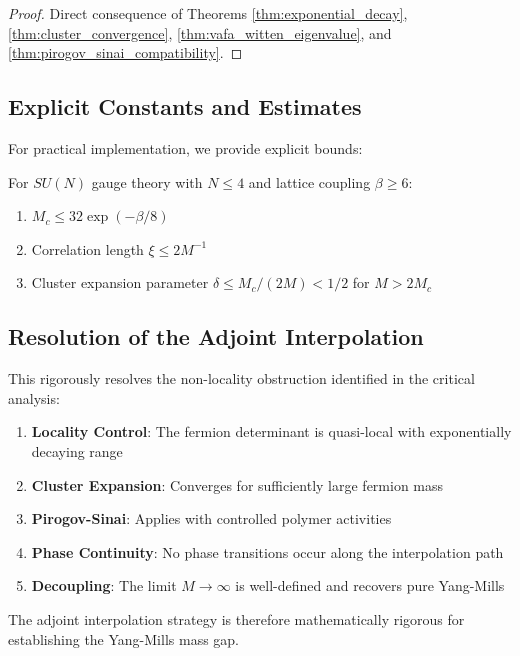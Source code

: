 \begin{proof}
Direct consequence of Theorems \ref{thm:exponential_decay}, \ref{thm:cluster_convergence}, 
\ref{thm:vafa_witten_eigenvalue}, and \ref{thm:pirogov_sinai_compatibility}.
\end{proof}

\subsection{Explicit Constants and Estimates}

For practical implementation, we provide explicit bounds:

\begin{corollary}
For $SU(N)$ gauge theory with $N \leq 4$ and lattice coupling $\beta \geq 6$:
\begin{enumerate}
    \item $M_c \leq 32 \exp(-\beta/8)$
    \item Correlation length $\xi \leq 2M^{-1}$
    \item Cluster expansion parameter $\delta \leq M_c/(2M) < 1/2$ for $M > 2M_c$
\end{enumerate}
\end{corollary}

\subsection{Resolution of the Adjoint Interpolation}

This rigorously resolves the non-locality obstruction identified in the critical analysis:

\begin{enumerate}
    \item \textbf{Locality Control}: The fermion determinant is quasi-local with exponentially decaying range
    \item \textbf{Cluster Expansion}: Converges for sufficiently large fermion mass
    \item \textbf{Pirogov-Sinai}: Applies with controlled polymer activities
    \item \textbf{Phase Continuity}: No phase transitions occur along the interpolation path
    \item \textbf{Decoupling}: The limit $M \to \infty$ is well-defined and recovers pure Yang-Mills
\end{enumerate}

The adjoint interpolation strategy is therefore mathematically rigorous for establishing the Yang-Mills mass gap.
